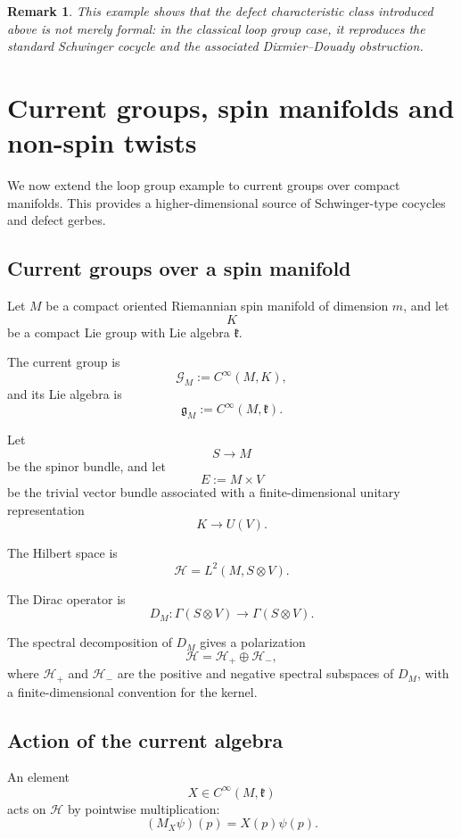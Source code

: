 \documentclass[11pt]{amsart}
\newtheorem{remark}[definition]{Remark}
\begin{document}
\begin{remark}
This example shows that the defect characteristic class introduced above is not merely formal: in the classical loop group case, it reproduces the standard Schwinger cocycle and the associated Dixmier--Douady obstruction.
\end{remark}

\section{Current groups, spin manifolds and non-spin twists}
\label{sec:current-groups-spin}

We now extend the loop group example to current groups over compact manifolds. This provides a higher-dimensional source of Schwinger-type cocycles and defect gerbes.

\subsection{Current groups over a spin manifold}

Let \(M\) be a compact oriented Riemannian spin manifold of dimension \(m\), and let
\[
K
\]
be a compact Lie group with Lie algebra \(\mathfrak k\).

The current group is
\[
\mathcal G_M:=C^\infty(M,K),
\]
and its Lie algebra is
\[
\mathfrak g_M:=C^\infty(M,\mathfrak k).
\]

Let
\[
S\to M
\]
be the spinor bundle, and let
\[
E:=M\times V
\]
be the trivial vector bundle associated with a finite-dimensional unitary representation
\[
K\to U(V).
\]

The Hilbert space is
\[
\mathcal H=L^2(M,S\otimes V).
\]

The Dirac operator is
\[
D_M:\Gamma(S\otimes V)\longrightarrow \Gamma(S\otimes V).
\]

The spectral decomposition of \(D_M\) gives a polarization
\[
\mathcal H=\mathcal H_+\oplus \mathcal H_-,
\]
where \(\mathcal H_+\) and \(\mathcal H_-\) are the positive and negative spectral subspaces of \(D_M\), with a finite-dimensional convention for the kernel.

\subsection{Action of the current algebra}

An element
\[
X\in C^\infty(M,\mathfrak k)
\]
acts on \(\mathcal H\) by pointwise multiplication:
\[
(M_X\psi)(p)=X(p)\psi(p).
\]
\end{document}
